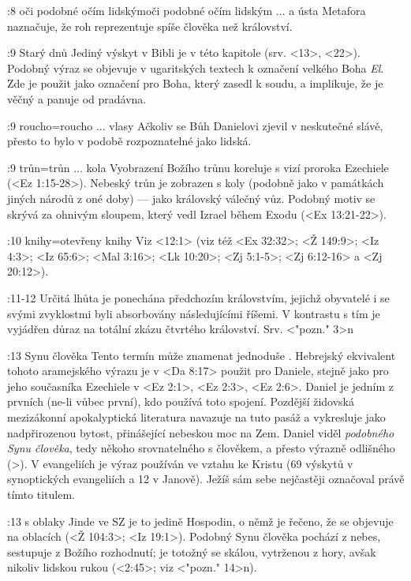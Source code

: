 :8 {oči podobné očím lidským}{oči podobné očím lidským ... a ústa}
     Metafora naznačuje, že roh reprezentuje spíše člověka než království. 
     
:9 {Starý dnů} Jediný výskyt v Bibli je v této kapitole (srv. <13>, <22>). Podobný výraz se objevuje v ugaritských textech k označení velkého Boha  {\em El}. Zde je použit jako označení pro Boha, který zasedl k soudu, a implikuje, že je věčný a  panuje od pradávna.

:9 {roucho}={roucho ... vlasy} Ačkoliv se Bůh Danielovi zjevil v neskutečné slávě, přesto to bylo v podobě rozpoznatelné jako lidská.

:9 {trůn}={trůn ... kola} Vyobrazení Božího trůnu koreluje s vizí proroka Ezechiele (<Ez 1:15-28>).
      Nebeský trůn je zobrazen s koly (podobně jako v památkách jiných národů z oné doby) --- jako královský válečný vůz. Podobný motiv se skrývá za ohnivým sloupem, který vedl Izrael během Exodu (<Ex 13:21-22>).

:10 {knihy}={otevřeny knihy} Viz  <12:1> (viz též <Ex 32:32>; <Ž 149:9>; <Iz 4:3>; <Iz 65:6>;  <Mal 3:16>; <Lk 10:20>; <Zj 5:1-5>; <Zj 6:12-16> a <Zj 20:12>).

:11-12 {}  Určitá lhůta je ponechána předchozím královstvím, jejichž obyvatelé i se svými zvyklostmi byli absorbovány následujícími říšemi. V kontrastu s tím je vyjádřen důraz na totální zkázu čtvrtého království. Srv. <"pozn." 3>n

:13 {Synu člověka} Tento termín může znamenat jednoduše . Hebrejský
   ekvivalent tohoto aramejského výrazu je v <Da 8:17>  použit pro Daniele, stejně jako pro jeho současníka    Ezechiele v <Ez 2:1>, <Ez 2:3>, <Ez 2:6>. 
   Daniel je jedním z prvních (ne-li
   vůbec první), kdo používá toto spojení.  Pozdější židovská mezizákonní apokalyptická
   literatura navazuje na tuto pasáž a vykresluje  jako nadpřirozenou bytost,
   přinášející nebeskou moc na Zem. Daniel viděl {\em podobného Synu člověka}, tedy někoho srovnatelného s člověkem, a přesto výrazně odlišného (>). V evangeliích  je výraz  používán ve vztahu ke Kristu (69 výskytů v synoptických evangeliích a 12 v Janově). Ježíš sám sebe nejčastěji označoval právě tímto titulem.

:13 {s oblaky} Jinde ve SZ je to jedině Hospodin, o němž je řečeno, že se objevuje na oblacích  (<Ž 104:3>; <Iz 19:1>). Podobný Synu člověka pochází z nebes, sestupuje z Božího rozhodnutí; je totožný se skálou, vytrženou z hory, avšak nikoliv lidskou rukou  (<2:45>; viz <"pozn." 14>n).

